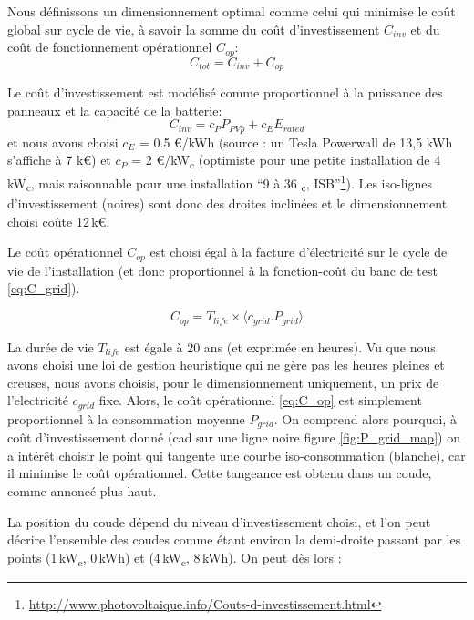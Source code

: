 \documentclass[a4paper,10pt,twocolumn]{article}
\providecommand{\avg}[1]{\langle#1\rangle}
\newcommand\sub[1]{\textsubscript{#1}}
\begin{document}
Nous définissons un dimensionnement optimal comme celui qui minimise le coût global sur cycle de vie,
à savoir la somme du coût d'investissement $C_{inv}$
et du coût de fonctionnement opérationnel $C_{op}$:
%
\begin{equation} \label{eq:C_tot}
  C_{tot} = C_{inv} + C_{op}
\end{equation}


Le coût d'investissement est modélisé comme proportionnel à la puissance
des panneaux et la capacité de la batterie:
%
\begin{equation} \label{eq:C_inv}
  C_{inv} = c_P P_{PVp} + c_E E_{rated}
\end{equation} 
et nous avons choisi $c_E$ = 0.5 €/kWh (source : un Tesla Powerwall de 13,5 kWh s'affiche à 7 k€)
et $c_P$ = 2 €/kW\sub{c} (optimiste pour une petite installation de 4 kW\sub{c},
mais raisonnable pour une installation ``9 à 36 \sub{c}, ISB''\footnote{\url{http://www.photovoltaique.info/Couts-d-investissement.html}}).
Les iso-lignes d'investissement (noires) sont donc des droites inclinées
et le dimensionnement choisi coûte 12\,k€.

Le coût opérationnel $C_{op}$ est choisi égal à la facture d'électricité
sur le cycle de vie de l'installation (et donc proportionnel à la fonction-coût
du banc de test \eqref{eq:C_grid}).

\begin{equation} \label{eq:C_op}
  C_{op} = T_{life} \times \avg{c_{grid}.P_{grid} }
\end{equation} 

La durée de vie $T_{life}$ est égale à 20 ans (et exprimée en heures).
Vu que nous avons choisi une loi de gestion heuristique qui ne gère pas les heures pleines et creuses,
nous avons choisis, pour le dimensionnement uniquement, un prix de l'electricité $c_{grid}$ fixe.
Alors, le coût opérationnel \eqref{eq:C_op} est simplement proportionnel à
la consommation moyenne $P_{grid}$.
On comprend alors pourquoi, à coût d'investissement donné (cad sur une ligne noire figure \ref{fig:P_grid_map})
on a intérêt choisir le point qui tangente une courbe iso-consommation (blanche),
car il minimise le coût opérationnel. Cette tangeance est obtenu dans un coude, comme annoncé plus haut.

La position du coude dépend du niveau d'investissement choisi,
et l'on peut décrire l'ensemble des coudes comme étant environ la demi-droite
passant par les points (1\,kW\sub{c}, 0\,kWh) et (4\,kW\sub{c}, 8\,kWh).
On peut dès lors :
\end{document}
